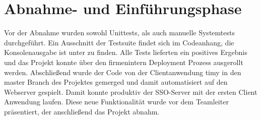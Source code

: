\section{Abnahme- und Einführungsphase} 
\label{sec:AbnahmeEinfuehrung}

Vor der Abnahme wurden sowohl Unittests, als auch manuelle Systemtests durchgeführt. Ein Ausschnitt der Testsuite findet sich im Codeanhang, die Konsolenausgabe ist unter  zu finden.
Alle Tests  lieferten ein positives Ergebnis und das Projekt konnte über den firmenintern Deployment Prozess ausgerollt werden.
Abschließend wurde der Code von der Clientanwendung timy in den master Branch des Projektes gemerged und damit automatisiert auf den Webserver gespielt.
Damit konnte produktiv der \ac{SSO}-Server mit der ersten Client Anwendung laufen. 
Diese neue Funktionalität wurde vor dem Teamleiter präsentiert, der anschließend das Projekt abnahm.
